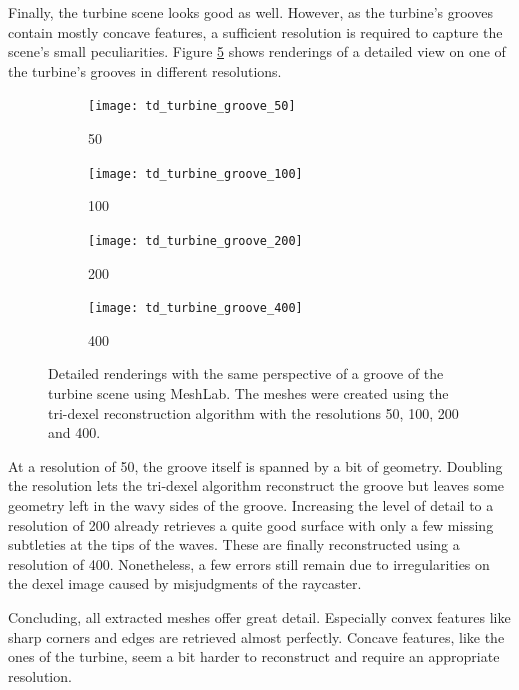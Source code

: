 Finally, the turbine scene looks good as well.
However, as the turbine's grooves contain mostly concave features, a sufficient resolution is required to capture the scene's small peculiarities.
Figure \ref{fig:td_grooves} shows renderings of a detailed view on one of the turbine's grooves in different resolutions.
%
\begin{figure}
	\centering
	\begin{subfigure}[b]{0.24\textwidth}
		\centering
		\texttt{[image: td\_turbine\_groove\_50]}
		\caption{50}
		\label{fig:td_turbine_groove_50}
	\end{subfigure}
	\begin{subfigure}[b]{0.24\textwidth}
		\centering
		\texttt{[image: td\_turbine\_groove\_100]}
		\caption{100}
		\label{fig:td_turbine_groove_100}
	\end{subfigure}
	\begin{subfigure}[b]{0.24\textwidth}
		\centering
		\texttt{[image: td\_turbine\_groove\_200]}
		\caption{200}
		\label{fig:td_turbine_groove_200}
	\end{subfigure}
	\begin{subfigure}[b]{0.24\textwidth}
		\centering
		\texttt{[image: td\_turbine\_groove\_400]}
		\caption{400}
		\label{fig:td_turbine_groove_400}
	\end{subfigure}
	\caption{
		Detailed renderings with the same perspective of a groove of the turbine scene using MeshLab.
		The meshes were created using the tri-dexel reconstruction algorithm with the resolutions 50, 100, 200 and 400.
	}
	\label{fig:td_grooves}
\end{figure}
%
At a resolution of 50, the groove itself is spanned by a bit of geometry.
Doubling the resolution lets the tri-dexel algorithm reconstruct the groove but leaves some geometry left in the wavy sides of the groove.
Increasing the level of detail to a resolution of 200 already retrieves a quite good surface with only a few missing subtleties at the tips of the waves.
These are finally reconstructed using a resolution of 400.
Nonetheless, a few errors still remain due to irregularities on the dexel image caused by misjudgments of the raycaster.

Concluding, all extracted meshes offer great detail.
Especially convex features like sharp corners and edges are retrieved almost perfectly.
Concave features, like the ones of the turbine, seem a bit harder to reconstruct and require an appropriate resolution.

